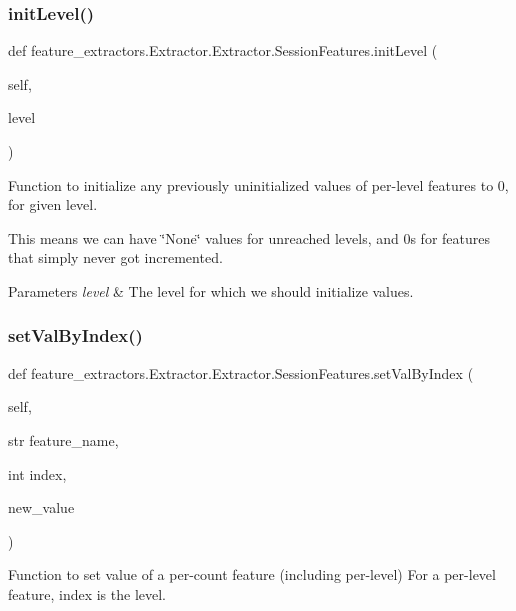 \subsubsection{\texorpdfstring{initLevel()}{initLevel()}}
{\footnotesize\ttfamily def feature\+\_\+extractors.\+Extractor.\+Extractor.\+Session\+Features.\+init\+Level (\begin{DoxyParamCaption}\item[{}]{self,  }\item[{}]{level }\end{DoxyParamCaption})}



Function to initialize any previously uninitialized values of per-\/level features to 0, for given level. 

This means we can have \char`\"{}\+None\char`\"{} values for unreached levels, and 0\textquotesingle{}s for features that simply never got incremented. 
\begin{DoxyParams}{Parameters}
{\em level} & The level for which we should initialize values. \\
\hline
\end{DoxyParams}
\mbox{\label{classfeature__extractors_1_1_extractor_1_1_extractor_1_1_session_features_a45dc0a1a5f95a531d94e0aada54cbc7b}} 
\subsubsection{\texorpdfstring{setValByIndex()}{setValByIndex()}}
{\footnotesize\ttfamily def feature\+\_\+extractors.\+Extractor.\+Extractor.\+Session\+Features.\+set\+Val\+By\+Index (\begin{DoxyParamCaption}\item[{}]{self,  }\item[{str}]{feature\+\_\+name,  }\item[{int}]{index,  }\item[{}]{new\+\_\+value }\end{DoxyParamCaption})}



Function to set value of a per-\/count feature (including per-\/level) For a per-\/level feature, index is the level. 


